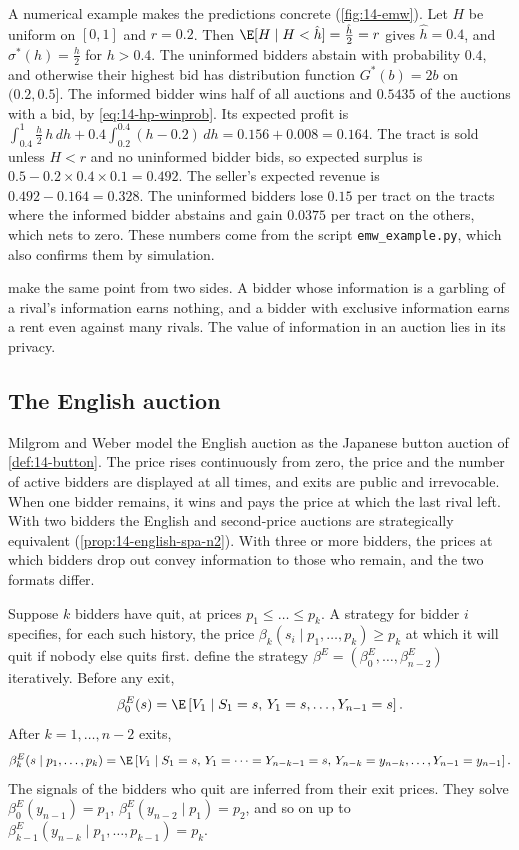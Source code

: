 A numerical example makes the predictions concrete (\cref{fig:14-emw}). Let $H$ be uniform on $[0,1]$ and
$r=0.2$. Then $\E[H\mid H<\hat h]=\frac{\hat h}{2}=r$ gives $\hat h=0.4$, and $\sigma^*(h)=\frac{h}{2}$ for
$h>0.4$. The uninformed bidders abstain with probability $0.4$, and otherwise their highest bid has
distribution function $G^*(b)=2b$ on $(0.2,0.5]$. The informed bidder wins half of all auctions and $0.5435$
of the auctions with a bid, by \eqref{eq:14-hp-winprob}. Its expected profit is
$\int_{0.4}^1\frac{h}{2}\,h\,dh+0.4\int_{0.2}^{0.4}(h-0.2)\,dh=0.156+0.008=0.164$. The tract is sold unless
$H<r$ and no uninformed bidder bids, so expected surplus is $0.5-0.2\times0.4\times0.1=0.492$. The seller's
expected revenue is $0.492-0.164=0.328$. The uninformed bidders lose $0.15$ per tract on the tracts where the
informed bidder abstains and gain $0.0375$ per tract on the others, which nets to zero. These numbers come from
the script \texttt{emw\_example.py}, which also confirms them by simulation.

 make the same point from two sides. A bidder whose information is a
garbling of a rival's information earns nothing, and a bidder with exclusive information earns a rent even
against many rivals. The value of information in an auction lies in its privacy.

\subsection{The English auction}\label{sec:14-mw-english}

Milgrom and Weber model the English auction as the Japanese button auction of
\cref{def:14-button}. The price rises continuously from zero, the price and the number of active bidders are
displayed at all times, and exits are public and irrevocable. When one bidder remains, it wins and pays the
price at which the last rival left. With two bidders the English and second-price auctions are strategically
equivalent (\cref{prop:14-english-spa-n2}). With three or more bidders, the prices at which bidders drop out
convey information to those who remain, and the two formats differ.

Suppose $k$ bidders have quit, at prices $p_1\le\dots\le p_k$. A strategy for bidder $i$ specifies, for each
such history, the price $\beta_k(s_i\mid p_1,\dots,p_k)\ge p_k$ at which it will quit if nobody else quits
first. \citet[eqs.~(5)--(6)]{MilgromWeber1982} define the strategy $\beta^E=(\beta^E_0,\dots,
\beta^E_{n-2})$ iteratively. Before any exit,
\begin{equation}\label{eq:14-mw-english0}
  \beta^E_0(s)=\E\left[V_1\mid S_1=s,\,Y_1=s,\dots,Y_{n-1}=s\right].
\end{equation}
After $k=1,\dots,n-2$ exits,
\begin{equation}\label{eq:14-mw-englishk}
  \beta^E_k(s\mid p_1,\dots,p_k)=\E\left[V_1\mid S_1=s,\,Y_1=\dots=Y_{n-k-1}=s,\,
  Y_{n-k}=y_{n-k},\dots,Y_{n-1}=y_{n-1}\right].
\end{equation}
The signals of the bidders who quit are inferred from their exit prices. They solve
$\beta^E_0(y_{n-1})=p_1$, $\beta^E_1(y_{n-2}\mid p_1)=p_2$, and so on up to
$\beta^E_{k-1}(y_{n-k}\mid p_1,\dots,p_{k-1})=p_k$.

